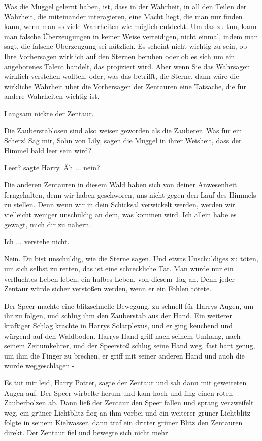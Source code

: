 \glqq{}Was die Muggel gelernt haben, ist, dass in der Wahrheit, in all den Teilen
der Wahrheit, die miteinander interagieren, eine Macht liegt, die man nur finden
kann, wenn man so viele Wahrheiten wie möglich entdeckt. Um das zu tun, kann man
falsche Überzeugungen in keiner Weise verteidigen, nicht einmal, indem man sagt,
die falsche Überzeugung sei nützlich. Es scheint nicht wichtig zu sein, ob Ihre
Vorhersagen wirklich auf den Sternen beruhen oder ob es sich um ein angeborenes
Talent handelt, das projiziert wird. Aber wenn Sie das Wahrsagen wirklich
verstehen wollten, oder, was das betrifft, die Sterne, dann wäre die wirkliche
Wahrheit über die Vorhersagen der Zentauren eine Tatsache, die für andere
Wahrheiten wichtig ist.\grqq{}

Langsam nickte der Zentaur.

\glqq{}Die Zauberstablosen sind also weiser geworden als die Zauberer. Was für
ein Scherz! Sag mir, Sohn von Lily, sagen die Muggel in ihrer Weisheit, dass der
Himmel bald leer sein wird?\grqq{}

\glqq{}Leer?\grqq{} sagte Harry. \glqq{}Äh ... nein?\grqq{}

\glqq{}Die anderen Zentauren in diesem Wald haben sich von deiner Anwesenheit
ferngehalten, denn wir haben geschworen, uns nicht gegen den Lauf des Himmels zu
stellen. Denn wenn wir in dein Schicksal verwickelt werden, werden wir
vielleicht weniger unschuldig an dem, was kommen wird. Ich allein habe es
gewagt, mich dir zu nähern.\grqq{}

\glqq{}Ich ... verstehe nicht.\grqq{}

\glqq{}Nein. Du bist unschuldig, wie die Sterne sagen. Und etwas Unschuldiges zu
töten, um sich selbst zu retten, das ist eine schreckliche Tat. Man würde nur
ein verfluchtes Leben leben, ein halbes Leben, von diesem Tag an. Denn jeder
Zentaur würde sicher verstoßen werden, wenn er ein Fohlen tötete.\grqq{}

Der Speer machte eine blitzschnelle Bewegung, zu schnell für Harrys Augen, um
ihr zu folgen, und schlug ihm den Zauberstab aus der Hand. Ein weiterer
kräftiger Schlag krachte in Harrys Solarplexus, und er ging keuchend und würgend
auf den Waldboden. Harrys Hand griff nach seinem Umhang, nach seinem
Zeitumkehrer, und der Speerstoß schlug seine Hand weg, fast hart genug, um ihm
die Finger zu brechen, er griff mit seiner anderen Hand und auch die wurde
weggeschlagen -

\glqq{}Es tut mir leid, Harry Potter\grqq{}, sagte der Zentaur und sah dann mit
geweiteten Augen auf. Der Speer wirbelte herum und kam hoch und fing einen roten
Zauberbolzen ab. Dann ließ der Zentaur den Speer fallen und sprang verzweifelt
weg, ein grüner Lichtblitz flog an ihm vorbei und ein weiterer grüner Lichtblitz
folgte in seinem Kielwasser, dann traf ein dritter grüner Blitz den Zentauren
direkt. Der Zentaur fiel und bewegte sich nicht mehr.

